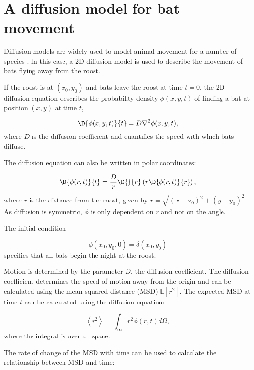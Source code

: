
\section{A diffusion model for bat movement}

Diffusion models are widely used to model animal movement for a number of species \cite{Ovaskainen2016}. In this case, a 2D diffusion model is used to describe the movement of bats flying away from the roost.

If the roost is at $(x_0,y_0)$ and bats leave the roost at time $t =0$,
the 2D diffusion equation describes the probability density $\phi(x,y,t)$ of
finding a bat at position $(x,y)$ at time $t$,

\begin{equation}
  \D{\phi(x,y,t)}{ t} = D \nabla^2 \phi(x,y,t) ,
  \nonumber
\end{equation}
%
where $D$ is the diffusion coefficient and quantifies the speed with which bats diffuse.

The diffusion equation can also be written in polar coordinates:

\begin{equation}
\D{ \phi(r,t)}{t} = \frac{D}{r} \D{}{ r} \left( r \D{\phi(r,t)}{r} \right),
\end{equation}
%
where $r$ is the distance from the roost, given by $r=\sqrt{(x-x_0)^2 + (y-y_0)^2}$. As diffusion is symmetric, $\phi$ is only dependent on $r$ and not on the angle.

The initial condition

\begin{equation}
\phi(x_0,y_0,0) = \delta(x_0,y_0)
\label{eqn:IC}
\end{equation}
%
specifies that all bats begin the night at the roost.

Motion is determined by the parameter $D$, the diffusion coefficient. The diffusion coefficient determines the speed of motion away from the origin and can be calculated using the mean squared distance (MSD) $\mathbb{E}[r^2]$. The expected MSD at time $t$ can be calculated using the diffusion equation:

\begin{equation}
\left<r^2\right> = \int_{\infty}r^2 \phi(r,t) d\Omega ,
\end{equation}
%
where the integral is over all space.

The rate of change of the MSD with time can be used to calculate the relationship between MSD and time:

